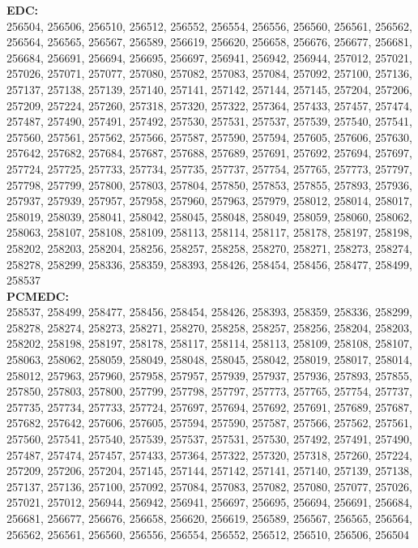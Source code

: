  \textbf{EDC:}\\
256504, 256506, 256510, 256512, 256552, 256554, 256556, 256560, 256561, 256562, 256564, 256565, 256567, 256589, 256619, 256620, 256658, 256676, 256677, 256681, 256684, 256691, 256694, 256695, 256697, 256941, 256942, 256944, 257012, 257021, 257026, 257071, 257077, 257080, 257082, 257083, 257084, 257092, 257100, 257136, 257137, 257138, 257139, 257140, 257141, 257142, 257144, 257145, 257204, 257206, 257209, 257224, 257260, 257318, 257320, 257322, 257364, 257433, 257457, 257474, 257487, 257490, 257491, 257492, 257530, 257531, 257537, 257539, 257540, 257541, 257560, 257561, 257562, 257566, 257587, 257590, 257594, 257605, 257606, 257630, 257642, 257682, 257684, 257687, 257688, 257689, 257691, 257692, 257694, 257697, 257724, 257725, 257733, 257734, 257735, 257737, 257754, 257765, 257773, 257797, 257798, 257799, 257800, 257803, 257804, 257850, 257853, 257855, 257893, 257936, 257937, 257939, 257957, 257958, 257960, 257963, 257979, 258012, 258014, 258017, 258019, 258039, 258041, 258042, 258045, 258048, 258049, 258059, 258060, 258062, 258063, 258107, 258108, 258109, 258113, 258114, 258117, 258178, 258197, 258198, 258202, 258203, 258204, 258256, 258257, 258258, 258270, 258271, 258273, 258274, 258278, 258299, 258336, 258359, 258393, 258426, 258454, 258456, 258477, 258499, 258537\\

 \textbf{PCMEDC:}\\
258537, 258499, 258477, 258456, 258454, 258426, 258393, 258359, 258336, 258299, 258278, 258274, 258273, 258271, 258270, 258258, 258257, 258256, 258204, 258203, 258202, 258198, 258197, 258178, 258117, 258114, 258113, 258109, 258108, 258107, 258063, 258062, 258059, 258049, 258048, 258045, 258042, 258019, 258017, 258014, 258012, 257963, 257960, 257958, 257957, 257939, 257937, 257936, 257893, 257855, 257850, 257803, 257800, 257799, 257798, 257797, 257773, 257765, 257754, 257737, 257735, 257734, 257733, 257724, 257697, 257694, 257692, 257691, 257689, 257687, 257682, 257642, 257606, 257605, 257594, 257590, 257587, 257566, 257562, 257561, 257560, 257541, 257540, 257539, 257537, 257531, 257530, 257492, 257491, 257490, 257487, 257474, 257457, 257433, 257364, 257322, 257320, 257318, 257260, 257224, 257209, 257206, 257204, 257145, 257144, 257142, 257141, 257140, 257139, 257138, 257137, 257136, 257100, 257092, 257084, 257083, 257082, 257080, 257077, 257026, 257021, 257012, 256944, 256942, 256941, 256697, 256695, 256694, 256691, 256684, 256681, 256677, 256676, 256658, 256620, 256619, 256589, 256567, 256565, 256564, 256562, 256561, 256560, 256556, 256554, 256552, 256512, 256510, 256506, 256504\\

